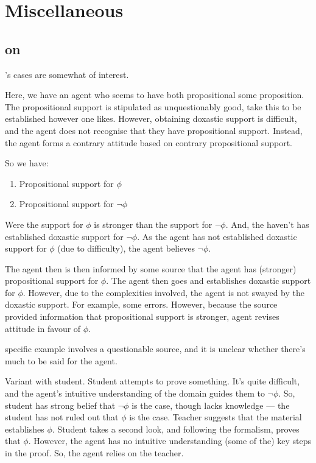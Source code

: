 \section{Miscellaneous}
\label{sec:misc}

\subsection{\citeauthor{Audi:1983ux} on \citeauthor{Lehrer:1971aa}}
\label{sec:lehrer}

\begin{note}[Lehrer]
  \citeauthor{Lehrer:1971aa}'s cases are somewhat of interest.

  Here, we have an agent who seems to have both propositional some proposition.
  The propositional support is stipulated as unquestionably good, take this to be established however one likes.
  However, obtaining doxastic support is difficult, and the agent does not recognise that they have propositional support.
  Instead, the agent forms a contrary attitude based on contrary propositional support.

  So we have:
  \begin{enumerate}
  \item\label{L:gl:prop:p} Propositional support for \(\phi\)
  \item\label{L:gl:prop:not-p} Propositional support for \(\lnot\phi\)
  \end{enumerate}
  Were the support for \(\phi\) is stronger than the support for \(\lnot\phi\).
  And, the haven't has established doxastic support for \(\lnot\phi\).
  As the agent has not established doxastic support for \(\phi\) (due to difficulty), the agent believes \(\lnot\phi\).

  The agent then is then informed by some source that the agent has (stronger) propositional support for \(\phi\).
  The agent then goes and establishes doxastic support for \(\phi\).
  However, due to the complexities involved, the agent is not swayed by the doxastic support.
  For example, some errors.
  However, because the source provided information that propositional support is stronger, agent revises attitude in favour of \(\phi\).
\end{note}

\begin{note}[Example]
  \citeauthor{Lehrer:1971aa} specific example involves a questionable source, and it is unclear whether there's much to be said for the agent.

  Variant with student.
  Student attempts to prove something.
  It's quite difficult, and the agent's intuitive understanding of the domain guides them to \(\lnot\phi\).
  So, student has strong belief that \(\lnot\phi\) is the case, though lacks knowledge --- the student has not ruled out that \(\phi\) is the case.
  Teacher suggests that the material establishes \(\phi\).
  Student takes a second look, and following the formalism, proves that \(\phi\).
  However, the agent has no intuitive understanding (some of the) key steps in the proof.
  So, the agent relies on the teacher.
\end{note}

